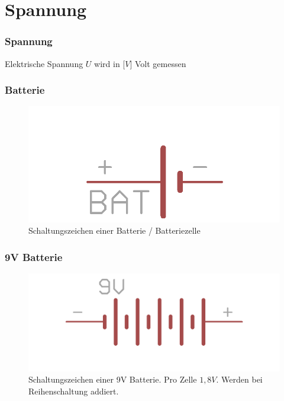 \section*{Spannung}

\begin{frame}
  \frametitle{Spannung}
  \begin{center}
    Elektrische Spannung $U$ wird in [$V$] Volt gemessen
  \end{center}
\end{frame}

\begin{frame}
  \frametitle{Batterie}
  \begin{center}
    \begin{figure}
      \includegraphics[width=\textwidth,height=.5\textheight,keepaspectratio]{e02/batterieEagle.png}
      \caption{Schaltungszeichen einer Batterie / Batteriezelle}
    \end{figure}
  \end{center}
\end{frame}

\begin{frame}
  \frametitle{9V Batterie}
  \begin{center}
    \begin{figure}
      \includegraphics[width=\textwidth,height=.5\textheight,keepaspectratio]{e02/9vBatEagle.png}
      \caption{Schaltungszeichen einer 9V Batterie. Pro Zelle $1,8V$. Werden bei Reihenschaltung addiert.}
    \end{figure}
  \end{center}
\end{frame}

